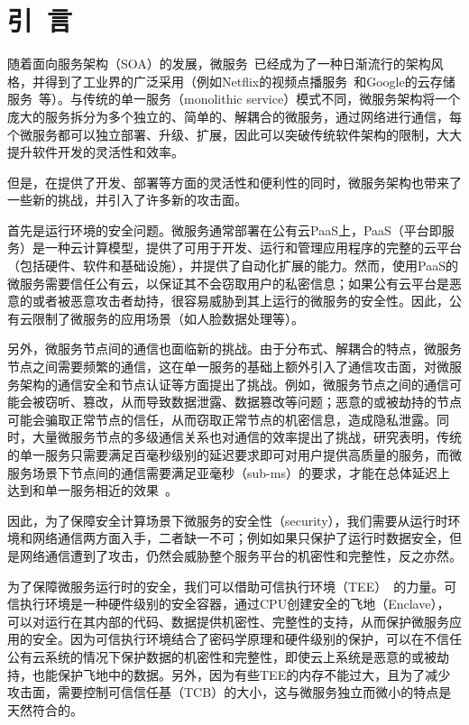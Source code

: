 \section{引\ 言}\label{sec:introduction}

随着面向服务架构（SOA）的发展，微服务~\cite{lewis2014microservices}已经成为了一种日渐流行的架构风格，并得到了工业界的广泛采用（例如Netflix的视频点播服务~\cite{msnetflix}和Google的云存储服务~\cite{msgoogle}等）。与传统的单一服务（monolithic service）模式不同，微服务架构将一个庞大的服务拆分为多个独立的、简单的、解耦合的微服务，通过网络进行通信，每个微服务都可以独立部署、升级、扩展，因此可以突破传统软件架构的限制，大大提升软件开发的灵活性和效率。


但是，在提供了开发、部署等方面的灵活性和便利性的同时，微服务架构也带来了一些新的挑战，并引入了许多新的攻击面。

首先是运行环境的安全问题。微服务通常部署在公有云PaaS上，PaaS（平台即服务）\cite{mell2011nist}是一种云计算模型，提供了可用于开发、运行和管理应用程序的完整的云平台（包括硬件、软件和基础设施），并提供了自动化扩展的能力。然而，使用PaaS的微服务需要信任公有云，以保证其不会窃取用户的私密信息；如果公有云平台是恶意的或者被恶意攻击者劫持，很容易威胁到其上运行的微服务的安全性。因此，公有云限制了微服务的应用场景（如人脸数据处理等）。

另外，微服务节点间的通信也面临新的挑战。由于分布式、解耦合的特点，微服务节点之间需要频繁的通信，这在单一服务的基础上额外引入了通信攻击面，对微服务架构的通信安全和节点认证等方面提出了挑战。例如，微服务节点之间的通信可能会被窃听、篡改，从而导致数据泄露、数据篡改等问题；恶意的或被劫持的节点可能会骗取正常节点的信任，从而窃取正常节点的机密信息，造成隐私泄露。同时，大量微服务节点的多级通信关系也对通信的效率提出了挑战，研究表明，传统的单一服务只需要满足百毫秒级别的延迟要求即可对用户提供高质量的服务，而微服务场景下节点间的通信需要满足亚毫秒（sub-ms）的要求，才能在总体延迟上达到和单一服务相近的效果~\cite{sriraman2018mutune}。

因此，为了保障安全计算场景下微服务的安全性（security），我们需要从运行时环境和网络通信两方面入手，二者缺一不可；例如如果只保护了运行时数据安全，但是网络通信遭到了攻击，仍然会威胁整个服务平台的机密性和完整性，反之亦然。

为了保障微服务运行时的安全，我们可以借助可信执行环境（TEE）~\cite{sabt2015trusted}的力量。可信执行环境是一种硬件级别的安全容器，通过CPU创建安全的飞地（Enclave），可以对运行在其内部的代码、数据提供机密性、完整性的支持，从而保护微服务应用的安全。因为可信执行环境结合了密码学原理和硬件级别的保护，可以在不信任公有云系统的情况下保护数据的机密性和完整性，即使云上系统是恶意的或被劫持，也能保护飞地中的数据。另外，因为有些TEE的内存不能过大，且为了减少攻击面，需要控制可信信任基（TCB）的大小，这与微服务独立而微小的特点是天然符合的。

